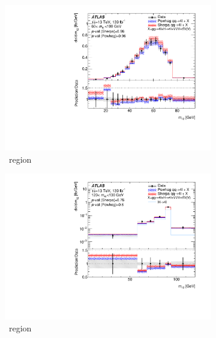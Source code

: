 \begin{figure}[H]
    \begin{subfigure}{.49\textwidth}\centering
      \includegraphics[width=.95\linewidth]{Figures/m4l/UnfoldedResults/linY_Unfolded_Data_m12_m4l60-100.pdf}  
      \caption{\ZFourL \ region}
      \label{fig:sub-first}
    \end{subfigure}
    \begin{subfigure}{.49\textwidth}\centering
      \includegraphics[width=.95\linewidth]{Figures/m4l/UnfoldedResults/higgs_Unfolded_Data_m12_m4l120-130.pdf}  
      \caption{\HFourL \ region}
      \label{fig:sub-second}
    \end{subfigure}
    \begin{subfigure}{.49\textwidth}
      \centering

\end{subfigure}
\end{figure}
